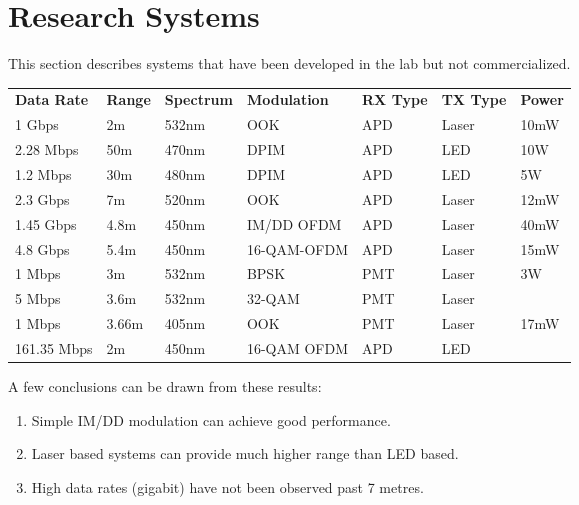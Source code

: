 \section{Research Systems}
This section describes systems that have been developed in the lab but not
commercialized.

\begin{table}[H]
\begin{tabular}{lllllll}
\textbf{Data Rate} & \textbf{Range} & \textbf{Spectrum} & \textbf{Modulation} &
\textbf{RX Type} & \textbf{TX Type} & \textbf{Power} \\
1 Gbps      & 2m     & 532nm & OOK         & APD & Laser & 10mW           \\
2.28 Mbps   & 50m    & 470nm & DPIM        & APD & LED   & 10W            \\
1.2 Mbps    & 30m    & 480nm & DPIM        & APD & LED   & 5W             \\
2.3 Gbps    & 7m     & 520nm & OOK         & APD & Laser & 12mW           \\
1.45 Gbps   & 4.8m   & 450nm & IM/DD OFDM  & APD & Laser & 40mW           \\
4.8 Gbps    & 5.4m   & 450nm & 16-QAM-OFDM & APD & Laser & 15mW           \\
1 Mbps      & 3m     & 532nm & BPSK        & PMT & Laser & 3W             \\
5 Mbps      & 3.6m   & 532nm & 32-QAM      & PMT & Laser &                \\
1 Mbps      & 3.66m  & 405nm & OOK         & PMT & Laser & 17mW           \\
161.35 Mbps & 2m     & 450nm & 16-QAM OFDM & APD & LED  &
\end{tabular}
\end{table}

A few conclusions can be drawn from these results:
\begin{enumerate}
\item Simple IM/DD modulation can achieve good performance.
\item Laser based systems can provide much higher range than \ac{LED} based.
\item High data rates (gigabit) have not been observed past 7 metres.
\end{enumerate}
